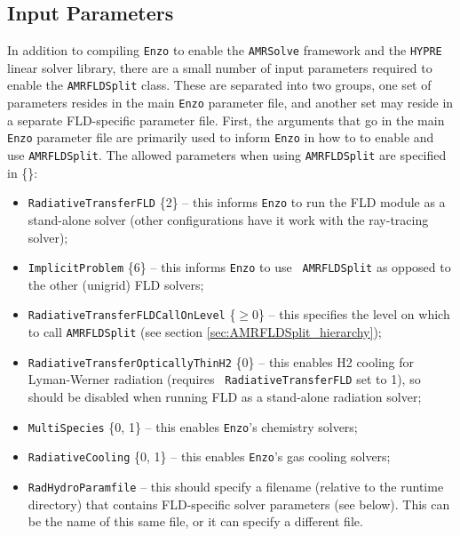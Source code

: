 \documentclass[letterpaper,10pt]{article}
\renewcommand{\(}{\left(}
\renewcommand{\)}{\right)}
\newcommand{\amrsolve}{{\tt AMRSolve} }
\newcommand{\enzo}{{\tt Enzo} }
\newcommand{\hypre}{{\tt HYPRE} }
\begin{document}
\subsection{Input Parameters}
\label{sec:AMRFLDSplit_parameters}

In addition to compiling \enzo to enable the \amrsolve framework and
the \hypre linear solver library, there are a small number of
input parameters required to enable the {\tt AMRFLDSplit} class.
These are separated into two groups, one set of parameters resides in
the main \enzo parameter file, and another set may reside in a
separate FLD-specific parameter file.  First, the arguments that go in
the main \enzo parameter file are primarily used to inform \enzo in
how to to enable and use {\tt AMRFLDSplit}.  The allowed parameters
when using {\tt AMRFLDSplit} are specified in \{\}:
\begin{itemize}
\item {\tt RadiativeTransferFLD} \{2\} -- this informs \enzo to run the
  FLD module as a stand-alone solver (other configurations have it
  work with the ray-tracing solver);
\item {\tt ImplicitProblem} \{6\} -- this informs \enzo to use {\tt
  AMRFLDSplit} as opposed to the other (unigrid) FLD solvers;
\item {\tt RadiativeTransferFLDCallOnLevel} \{$\ge 0$\; [0]\} -- this
  specifies the level on which to call {\tt AMRFLDSplit} (see section
  \ref{sec:AMRFLDSplit_hierarchy}); 
\item {\tt RadiativeTransferOpticallyThinH2} \{0\} -- this enables H2
  cooling for Lyman-Werner radiation (requires {\tt
    RadiativeTransferFLD} set to 1), so should be disabled when
  running FLD as a stand-alone radiation solver;
\item {\tt MultiSpecies} \{0, 1\} -- this enables {\tt Enzo}'s chemistry
  solvers;
\item {\tt RadiativeCooling} \{0, 1\} -- this enables {\tt Enzo}'s gas
  cooling solvers;
\item {\tt RadHydroParamfile} -- this should specify a filename
  (relative to the runtime directory) that contains FLD-specific
  solver parameters (see below).  This can be the name of this same
  file, or it can specify a different file.
\end{itemize}
\end{document}
